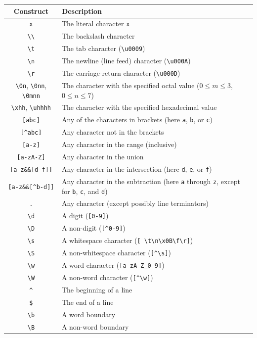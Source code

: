 \documentclass[a4paper,12pt]{article}
\begin{document}
\noindent \begin{tabular*}{\textwidth}{|c|l|}
\hline
Construct & Description \\
\hline
\verb/x/ & The literal character \verb/x/ \\
\verb/\\/ & The backslash character \\
\verb/\t/ & The tab character (\verb/\u0009/) \\
\verb/\n/ & The newline (line feed) character (\verb/\u000A/) \\
\verb/\r/ & The carriage-return character (\verb/\u000D/) \\
\verb/\0n/, \verb/\0nn/, \verb/\0mnn/ & The character with the specified octal value ($0 \le m \le 3$, $0 \le n \le 7$) \\
\verb/\xhh/, \verb/\uhhhh/ & The character with the specified hexadecimal value \\
\verb/[abc]/ & Any of the characters in brackets (here \verb/a/, \verb/b/, or \verb/c/)\\
\verb/[^abc]/ & Any character not in the brackets \\
\verb/[a-z]/ & Any character in the range (inclusive) \\
\verb/[a-zA-Z]/ & Any character in the union \\
\verb/[a-z&&[d-f]]/ & Any character in the intersection (here \verb/d/, \verb/e/, or \verb/f/) \\
\verb/[a-z&&[^b-d]]/ & Any character in the subtraction (here \verb/a/ through \verb/z/, except for \verb/b/, \verb/c/, and \verb/d/) \\
\verb/./ & Any character (except possibly line terminators) \\
\verb/\d/ & A digit (\verb/[0-9]/) \\
\verb/\D/ & A non-digit (\verb/[^0-9]/) \\
\verb/\s/ & A whitespace character (\verb/[ \t\n\x0B\f\r]/) \\
\verb/\S/ & A non-whitespace character (\verb/[^\s]/) \\
\verb/\w/ & A word character (\verb/[a-zA-Z_0-9]/) \\
\verb/\W/ & A non-word character (\verb/[^\w]/) \\
\verb/^/ & The beginning of a line \\
\verb/$/ & The end of a line \\
\verb/\b/ & A word boundary \\
\verb/\B/ & A non-word boundary \\

\end{tabular*}
\end{document}
